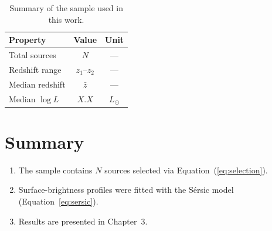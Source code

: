 \begin{table}[htbp]
\centering
\caption[Sample summary]{Summary of the sample used in this work.}
\label{tab:sample}
\begin{tabular}{lcc}
\toprule
Property & Value & Unit \\
\midrule
Total sources   & $N$           & ---       \\
Redshift range  & $z_1$--$z_2$  & ---       \\
Median redshift & $\bar{z}$     & ---       \\
Median $\log L$ & $X.X$         & $L_\odot$ \\
\bottomrule
\end{tabular}
\end{table}


\section{Summary}

\begin{enumerate}
    \item The sample contains $N$ sources selected via
          Equation~(\ref{eq:selection}).
    \item Surface-brightness profiles were fitted with the S\'{e}rsic
          model (Equation~\ref{eq:sersic}).
    \item Results are presented in Chapter~3.
\end{enumerate}

